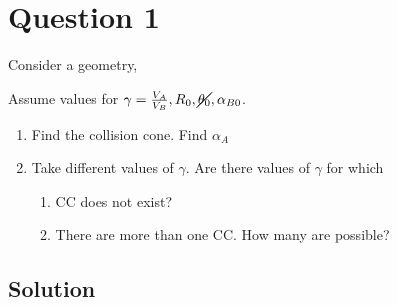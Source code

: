 \section*{Question 1}

Consider a geometry,

Assume values for \( \gamma = \frac{V_A}{V_B}, R_0, \cancel{\theta_0}, \alpha_{B0} \).
\begin{enumerate}[label= (\alph*), noitemsep, topsep=0pt]
    \item Find the collision cone.
          Find \( \alpha_A \)
    \item Take different values of \( \gamma \). Are there values of \( \gamma \) for which
          \begin{enumerate}[label= (\alph*), noitemsep, topsep=0pt]
              \item CC does not exist?
              \item There are more than one CC.
                    How many are possible?
          \end{enumerate}
\end{enumerate}

\subsection*{Solution}
